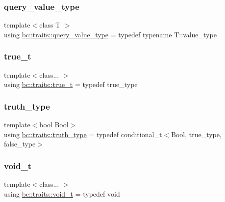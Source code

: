 \subsubsection{\texorpdfstring{query\+\_\+value\+\_\+type}{query\_value\_type}}
{\footnotesize\ttfamily template$<$class T $>$ \\
using \hyperlink{namespacebc_1_1traits_a40b9437a2ec1bb34ee7d506c8053f906}{bc\+::traits\+::query\+\_\+value\+\_\+type} = typedef typename T\+::value\+\_\+type}

\mbox{\label{namespacebc_1_1traits_a5753b5335a2644153a1e6a98209b0b22}} 
\subsubsection{\texorpdfstring{true\+\_\+t}{true\_t}}
{\footnotesize\ttfamily template$<$class... $>$ \\
using \hyperlink{namespacebc_1_1traits_a5753b5335a2644153a1e6a98209b0b22}{bc\+::traits\+::true\+\_\+t} = typedef true\+\_\+type}

\mbox{\label{namespacebc_1_1traits_ac91a9795000ae7f483efbaf74c9872e8}} 
\subsubsection{\texorpdfstring{truth\+\_\+type}{truth\_type}}
{\footnotesize\ttfamily template$<$bool Bool$>$ \\
using \hyperlink{namespacebc_1_1traits_ac91a9795000ae7f483efbaf74c9872e8}{bc\+::traits\+::truth\+\_\+type} = typedef conditional\+\_\+t$<$Bool, true\+\_\+type, false\+\_\+type$>$}

\mbox{\label{namespacebc_1_1traits_a41800b73eece865ca4b2b2faaac9974a}} 
\subsubsection{\texorpdfstring{void\+\_\+t}{void\_t}}
{\footnotesize\ttfamily template$<$class... $>$ \\
using \hyperlink{namespacebc_1_1traits_a41800b73eece865ca4b2b2faaac9974a}{bc\+::traits\+::void\+\_\+t} = typedef void}



